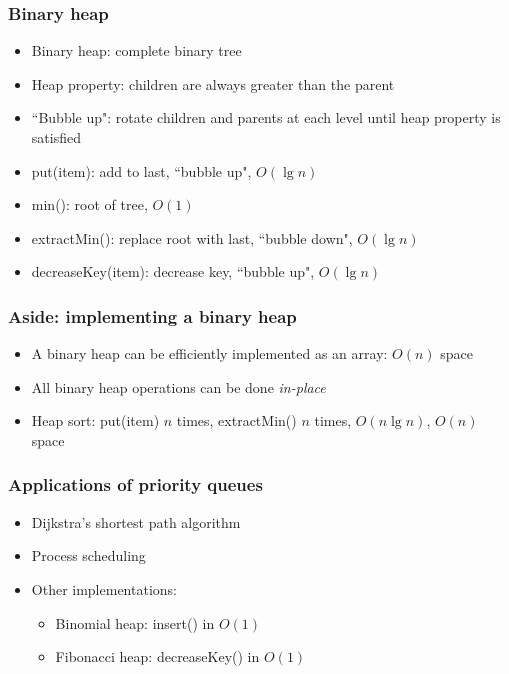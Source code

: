 \documentclass{beamer}
\begin{document}
\begin{frame}
 \frametitle{Binary heap}
 \begin{center}
  \scalebox{0.6} {
  }
 \end{center}
 \begin{itemize}
  \item Binary heap: complete binary tree
  \item Heap property: children are always greater than the parent
  \item ``Bubble up": rotate children and parents at each level until
        heap property is satisfied
  \item put(item): add to last, ``bubble up", $O(\lg n)$
  \item min(): root of tree, $O(1)$
  \item extractMin(): replace root with last, ``bubble down", $O(\lg n)$
  \item decreaseKey(item): decrease key, ``bubble up", $O(\lg n)$
 \end{itemize}
\end{frame}

\begin{frame}
 \frametitle{Aside: implementing a binary heap}
 \begin{itemize}
  \item A binary heap can be efficiently implemented as an array: $O(n)$
        space
  \item All binary heap operations can be done \emph{in-place}
  \item Heap sort: put(item) $n$ times, extractMin() $n$ times,
        $O(n \lg n)$, $O(n)$ space
 \end{itemize}
\end{frame}

\begin{frame}
 \frametitle{Applications of priority queues}
 \begin{itemize}
  \item Dijkstra's shortest path algorithm
  \item Process scheduling
  \item Other implementations:
  \begin{itemize}
   \item Binomial heap: insert() in $O(1)$
   \item Fibonacci heap: decreaseKey() in $O(1)$
  \end{itemize}
 \end{itemize}
\end{frame}
\end{document}
